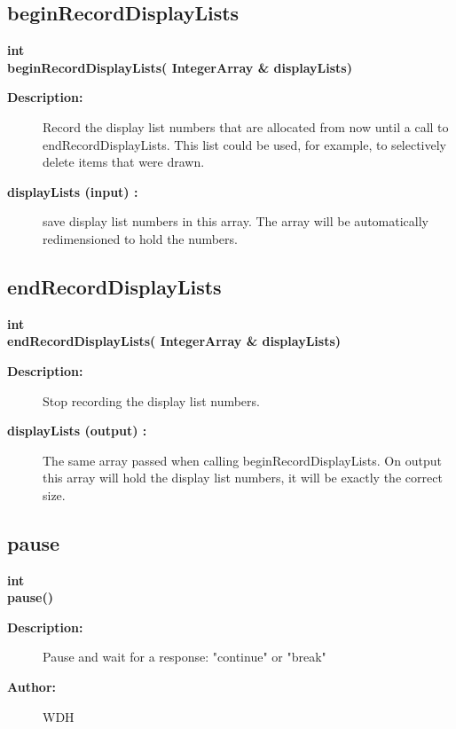 \subsection{beginRecordDisplayLists}
 
\begin{flushleft} \textbf{%
int  \\ 
\settowidth{\GLGraphicsInterfaceIncludeArgIndent}{beginRecordDisplayLists(}%
beginRecordDisplayLists( IntegerArray \& displayLists)
}\end{flushleft}
\begin{description}
\item[{\bf Description:}] 
    Record the display list numbers that are allocated from now until
 a call to endRecordDisplayLists. This list could be used, for example, to selectively
 delete items that were drawn.

\item[{\bf displayLists (input) :}]  save display list numbers in this array. The array will
  be automatically redimensioned to hold the numbers.
\end{description}
\subsection{endRecordDisplayLists}
 
\begin{flushleft} \textbf{%
int  \\ 
\settowidth{\GLGraphicsInterfaceIncludeArgIndent}{endRecordDisplayLists(}%
endRecordDisplayLists( IntegerArray \& displayLists)
}\end{flushleft}
\begin{description}
\item[{\bf Description:}] 
    Stop recording the display list numbers. 
 
\item[{\bf displayLists (output) :}]  The same array passed when calling beginRecordDisplayLists.
 On output this array will hold the display list numbers, it will be exactly the correct size.
 
\end{description}
\subsection{pause}
 
\begin{flushleft} \textbf{%
int  \\ 
\settowidth{\GLGraphicsInterfaceIncludeArgIndent}{pause(}%
pause()
}\end{flushleft}
\begin{description}
\item[{\bf Description:}] 
   Pause and wait for a response: "continue" or "break"
\item[{\bf Author:}]  WDH
\end{description}
